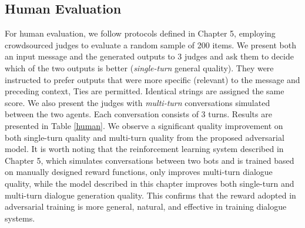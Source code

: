 \begin{comment}
\subsection{N-choose-1 Metric}
We evaluate the model using an N-choose-1 ranking metric, as described in \newcite{shao15}. 
 In
the N-choose-1 evaluation, given dialogue history, we ask the generator to score N candidate responses, where one of the N candidate responses is the ground truth and the rest are random responses.
N-choose-1 accuracy is defined to be the fraction of test cases in which the trained model assigns the highest score to the ground truth.
We report 50-, 10-, and 2-choose-1 accuracy. Results are shown in Table \ref{choose}. 
Again we see a clear performance boost from the adversarial model over the
standard \sts variants.

\begin{table}
\small
\centering
\begin{tabular}{cccc}
\hline
Model&50&10&2\\\hline
\sts&0.087&0.28&0.73 \\
MMI&0.43&0.69&0.88\\
Adversarial&0.53&0.75&0.95\\\hline
\end{tabular}
\caption{N-choose-1 evaluation on different models.}
\label{choose}
\end{table}
\end{comment}

\subsection{Human Evaluation}
For human evaluation, we follow protocols defined in Chapter 5, employing
crowdsourced judges to evaluate a random sample of
200 items. We present both an input message and the
generated outputs to 3 judges and ask them to decide
which of the two outputs is better ({\it single-turn}
general quality). 
They were instructed to prefer outputs that were more specific (relevant) to the message and preceding context,
Ties are permitted. Identical
strings are assigned the same score. 
We also
 present the judges with {\it multi-turn}
conversations simulated between the two agents. Each conversation
consists of 3 turns.
Results are presented in Table \ref{human}.
We observe a significant quality improvement on both 
single-turn quality and multi-turn quality from the proposed adversarial model.
It is worth noting that the reinforcement learning system described in Chapter 5, which 
simulates conversations between two bots and 
is trained based on manually designed reward functions, only improves multi-turn dialogue quality, while the model described in this chapter improves both single-turn and multi-turn dialogue generation quality. 
This confirms that the reward adopted in adversarial training is more general, natural, and effective in training dialogue systems.


